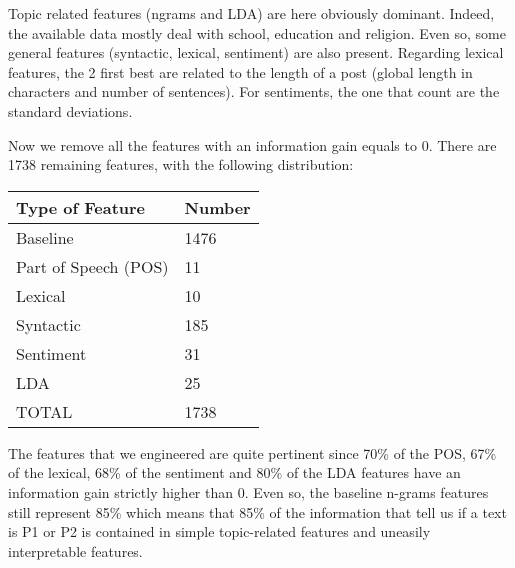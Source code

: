 Topic related features (ngrams and LDA) are here obviously dominant. Indeed, the available data mostly deal with school, education and religion. Even so, some general features (syntactic, lexical, sentiment) are also present. Regarding lexical features, the 2 first best are related to the length of a post (global length in characters and number of sentences). For sentiments, the one that count are the standard deviations.

Now we remove all the features with an information gain equals to 0. There are 1738 remaining features, with the following distribution:
\\
\begin{table}[H]
\centering
\begin{tabular}{|l|l|}
\hline
Type of Feature      & Number \\ \hline
Baseline             & 1476  \\ \hline
Part of Speech (POS) & 11     \\ \hline
Lexical              & 10     \\ \hline
Syntactic            & 185   \\ \hline
Sentiment            & 31     \\ \hline
LDA                  & 25     \\ \hline
\rowcolor[HTML]{C0C0C0} 
TOTAL                & 1738  \\ \hline
\end{tabular}
\end{table}

The features that we engineered are quite pertinent since 70\% of the POS, 67\% of the lexical, 68\% of the sentiment and 80\% of the LDA features have an information gain strictly higher than 0. Even so, the baseline n-grams features still represent 85\% which means that 85\% of the information that tell us if a text is P1 or P2 is contained in simple topic-related features and uneasily interpretable features.

